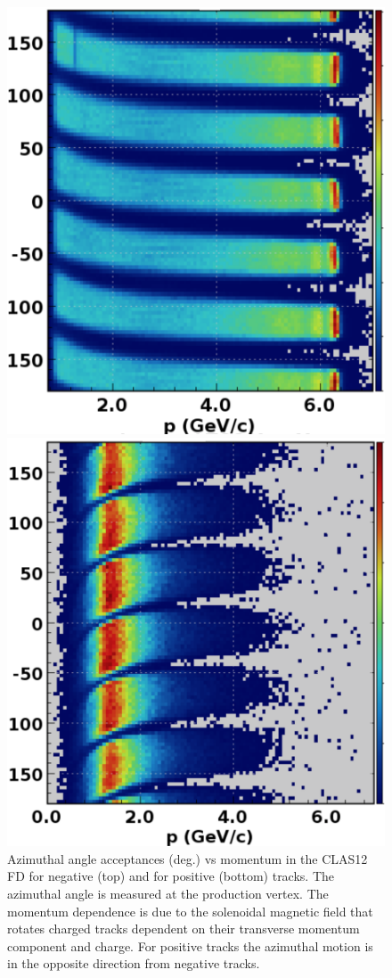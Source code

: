 \documentclass[final,3p,twocolumn]{elsarticle}
\begin{document}
\begin{figure}[t!]
\centerline{\includegraphics[width=0.9\columnwidth]{neg-tracks.png}}
\vspace{0.3cm}\centerline{\includegraphics[width=0.9\columnwidth]{pos-tracks.png}}
\caption{Azimuthal angle acceptances (deg.) vs momentum in the CLAS12 FD for negative (top) and for positive
  (bottom) tracks. The azimuthal angle is measured at the production vertex. The momentum dependence is due to
  the solenoidal magnetic field that rotates charged tracks dependent on their transverse momentum component
  and charge. For positive tracks the azimuthal motion is in the opposite direction from negative tracks.} 
\label{neg-pos}
\end{figure}
\end{document}
